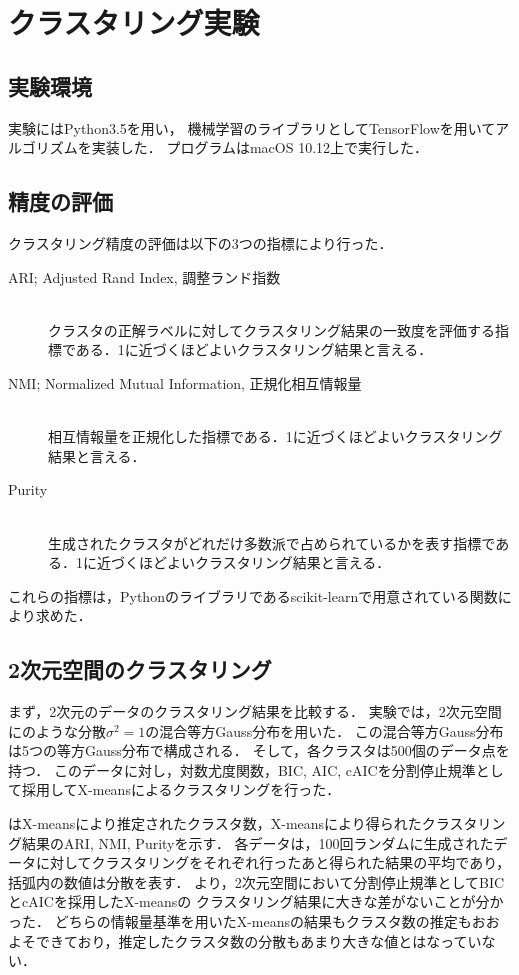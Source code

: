 \section{クラスタリング実験}

\subsection{実験環境}

実験にはPython3.5を用い，
機械学習のライブラリとしてTensorFlowを用いてアルゴリズムを実装した．
プログラムはmacOS 10.12上で実行した．

\subsection{精度の評価}

クラスタリング精度の評価は以下の3つの指標により行った．
\begin{description}
  \item[ARI; Adjusted Rand Index, 調整ランド指数]~\\
    クラスタの正解ラベルに対してクラスタリング結果の一致度を評価する指標である．1に近づくほどよいクラスタリング結果と言える．
  \item[NMI; Normalized Mutual Information, 正規化相互情報量]~\\
    相互情報量を正規化した指標である．1に近づくほどよいクラスタリング結果と言える．
  \item[Purity]~\\
    生成されたクラスタがどれだけ多数派で占められているかを表す指標である．1に近づくほどよいクラスタリング結果と言える．
\end{description}
これらの指標は，Pythonのライブラリであるscikit-learnで用意されている関数により求めた．

\subsection{2次元空間のクラスタリング}

まず，2次元のデータのクラスタリング結果を比較する．
実験では，2次元空間にのような分散$\sigma^2=1$の混合等方Gauss分布を用いた．
この混合等方Gauss分布は5つの等方Gauss分布で構成される．
そして，各クラスタは500個のデータ点を持つ．
このデータに対し，対数尤度関数，BIC, AIC, cAICを分割停止規準として採用してX-meansによるクラスタリングを行った．

はX-meansにより推定されたクラスタ数，X-meansにより得られたクラスタリング結果のARI, NMI, Purityを示す．
各データは，100回ランダムに生成されたデータに対してクラスタリングをそれぞれ行ったあと得られた結果の平均であり，括弧内の数値は分散を表す．
より，2次元空間において分割停止規準としてBICとcAICを採用したX-meansの
クラスタリング結果に大きな差がないことが分かった．
どちらの情報量基準を用いたX-meansの結果もクラスタ数の推定もおおよそできており，推定したクラスタ数の分散もあまり大きな値とはなっていない．

